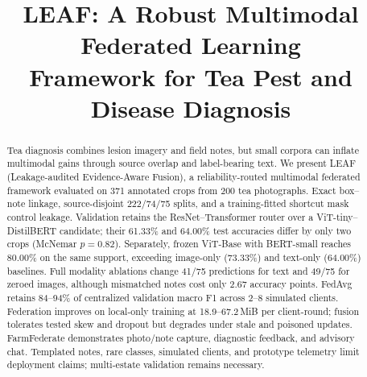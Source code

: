 \documentclass[conference]{IEEEtran}
\begin{document}
\raggedbottom
\linespread{0.87}\selectfont
\renewcommand{\arraystretch}{0.92}
\setlength{\textfloatsep}{2pt plus 1pt minus 0.5pt}
\setlength{\dbltextfloatsep}{2pt plus 1pt minus 0.5pt}
\setlength{\floatsep}{2pt plus 1pt minus 0.5pt}
\setlength{\intextsep}{2pt plus 1pt minus 0.5pt}
\setlength{\abovecaptionskip}{2pt}
\setlength{\belowcaptionskip}{0.5pt}
\setlength{\topsep}{1.5pt}
\setlength{\partopsep}{0pt}
\setlength{\itemsep}{0pt}
\setlength{\parsep}{0pt}

\renewcommand{\dbltopfraction}{0.97}
\renewcommand{\dblfloatpagefraction}{0.93}
\renewcommand{\topfraction}{0.97}
\renewcommand{\floatpagefraction}{0.93}
\renewcommand{\textfraction}{0.03}
\setcounter{dbltopnumber}{6}
\setcounter{totalnumber}{12}
\setcounter{bottomnumber}{4}
\renewcommand{\bottomfraction}{0.75}
\setcounter{topnumber}{6}

\title{LEAF: A Robust Multimodal Federated Learning\\
Framework for Tea Pest and Disease Diagnosis}

\author{
}

\maketitle

\begin{abstract}
Tea diagnosis combines lesion imagery and field notes, but small corpora can
inflate multimodal gains through source overlap and label-bearing text. We
present LEAF (Leakage-audited Evidence-Aware Fusion), a reliability-routed
multimodal federated framework evaluated on 371 annotated crops from 200 tea
photographs. Exact box--note linkage, source-disjoint 222/74/75 splits, and a
training-fitted shortcut mask control leakage. Validation retains the
ResNet--Transformer router over a ViT-tiny--DistilBERT candidate; their
61.33\% and 64.00\% test accuracies differ by only two crops
(McNemar $p=0.82$). Separately, frozen ViT-Base with BERT-small reaches
80.00\% on the same support, exceeding image-only (73.33\%) and text-only
(64.00\%) baselines. Full modality ablations change 41/75 predictions for
text and 49/75 for zeroed images, although mismatched notes cost only 2.67
accuracy points. FedAvg retains 84--94\% of centralized validation macro F1
across 2--8 simulated clients. Federation improves on local-only training at
18.9--67.2\,MiB per client-round; fusion tolerates tested skew and dropout
but degrades under stale and poisoned updates. FarmFederate demonstrates
photo/note capture, diagnostic feedback, and advisory chat. Templated notes,
rare classes, simulated clients, and prototype telemetry limit deployment
claims; multi-estate validation remains necessary.

\end{abstract}
\end{document}
